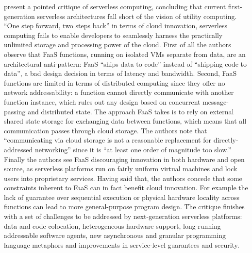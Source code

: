 \parencite{hellerstein18twoStepsBack} present a pointed critique of serverless computing, concluding that current first-generation serverless architectures fall short of the vision of utility computing. ``One step forward, two steps back'' in terms of cloud innovation, serverless computing fails to enable developers to seamlessly harness the practically unlimited storage and processing power of the cloud. First of all the authors observe that FaaS functions, running on isolated VMs separate from data, are an architectural anti-pattern: FaaS ``ships data to code'' instead of ``shipping code to data'', a bad design decision in terms of latency and bandwidth. Second, FaaS functions are limited in terms of distributed computing since they offer no network addressability: a function cannot directly communicate with another function instance, which rules out any design based on concurrent message-passing and distributed state. The approach FaaS takes is to rely on external shared state storage for exchanging data between functions, which means that all communication passes through cloud storage. The authors note that ``communicating via cloud storage is not a reasonable replacement for directly-addressed networking'' since it is ``at least one order of magnitude too slow.'' Finally the authors see FaaS discouraging innovation in both hardware and open source, as serverless platforms run on fairly uniform virtual machines and lock users into proprietary services. Having said that, the authors concede that some constraints inherent to FaaS can in fact benefit cloud innovation. For example the lack of guarantee over sequential execution or physical hardware locality across functions can lead to more general-purpose program design. The critique finishes with a set of challenges to be addressed by next-generation serverless platforms: data and code colocation, heterogeneous hardware support, long-running addressable software agents, new asynchronous and granular programming language metaphors and improvements in service-level guarantees and security.

